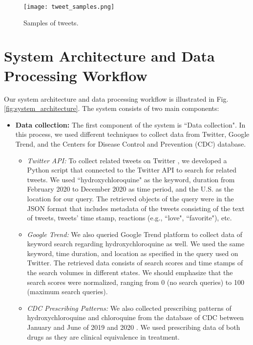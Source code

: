 \documentclass[conference]{IEEEtran}
\begin{document}
	\begin{figure}[th!]
		\centering 
		\texttt{[image: tweet\_samples.png]} 
		\caption{Samples of tweets.}
		\label{fig:tweet_sample} 
		\vspace{-0.2in}
	\end{figure}
	
	\section{System Architecture and Data Processing Workflow}
	
	Our system architecture and data processing workflow is illustrated in Fig. \ref{fig:system_architecture}. The system consists of two main components:
	
	\begin{itemize}
		\item {\bf Data collection:} The first component of the system is ``Data collection". In this process, we used different techniques to collect data from Twitter, Google Trend, and the Centers for Disease Control and Prevention (CDC) database. 
		\begin{itemize}
			\item {\it Twitter API:} To collect related tweets on Twitter \cite{b15}, we developed a Python script that connected to the Twitter API to search for related tweets. We used ``hydroxychloroquine" as the keyword, duration from February 2020 to December 2020 as time period, and the U.S. as the location for our query. The retrieved objects of the query were in the JSON format that includes metadata of the tweets consisting of the text of tweets, tweets' time stamp, reactions (e.g., ``love", ``favorite"), etc. 
			\item {\it Google Trend:} We also queried Google Trend platform \cite{b18} to collect data of keyword search regarding hydroxychloroquine as well. We used the same keyword, time duration, and location as specified in the query used on Twitter. The retrieved data consists of search scores and time stamps of the search volumes in different states. We should emphasize that the search scores were normalized, ranging from 0 (no search queries) to 100 (maximum search queries).
			\item {\it CDC Prescribing Patterns:} We also collected prescribing patterns of hydroxychloroquine and chloroquine from the database of CDC between January and June of 2019 and 2020 \cite{b8}. We used prescribing data of both drugs as they are clinical equivalence in treatment.
			

\end{itemize}
\end{itemize}
\end{document}
